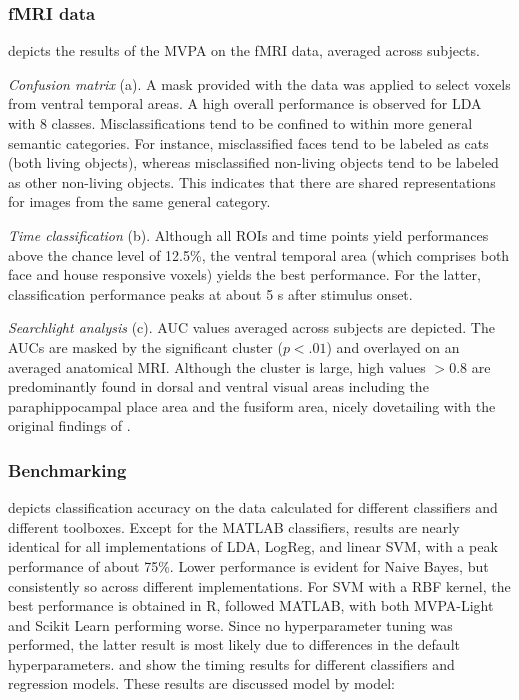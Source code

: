 \documentclass[utf8]{frontiersSCNS} %
\begin{document}
\subsubsection{fMRI data}

 depicts the results of the MVPA on the fMRI data, averaged across subjects.

\textit{Confusion matrix} (a). A mask provided with the data was applied to select voxels from ventral temporal areas.
A high overall performance is observed for LDA with 8 classes. Misclassifications tend to be confined to within more general semantic categories. For instance, misclassified faces tend to be labeled as cats (both living objects), whereas misclassified non-living objects tend to be labeled as other non-living objects. This indicates that there are shared representations for images from the same general category.

\textit{Time classification} (b). Although all ROIs and time points yield performances above the chance level of 12.5\%, the ventral temporal area (which comprises both face and house responsive voxels) yields the best performance. For the latter, classification performance peaks at about 5 s after stimulus onset.

\textit{Searchlight analysis} (c). AUC values averaged across subjects are depicted. The AUCs are masked by the significant cluster ($p < .01$) and overlayed on an averaged anatomical MRI. Although the cluster is large, high values $>0.8$ are predominantly found in dorsal and ventral visual areas including the paraphippocampal place area and the fusiform area, nicely dovetailing with the original findings of \cite{Haxby2001}.

\subsubsection{Benchmarking}

 depicts classification accuracy on the \cite{Wakeman2015ADataset} data calculated for different classifiers and different toolboxes. Except for the MATLAB classifiers, results are nearly identical  for all implementations of LDA, LogReg, and linear SVM, with a peak performance of about 75\%. Lower performance is evident for Naive Bayes, but consistently so across different implementations. For SVM with a RBF kernel, the best performance is obtained in R, followed MATLAB, with both MVPA-Light and Scikit Learn performing worse. Since no hyperparameter tuning was performed, the latter result is most likely due to differences in the default hyperparameters.  and  show the timing results for different classifiers and regression models. These results are discussed model by model:
\end{document}
